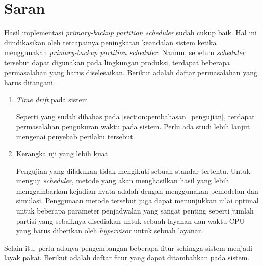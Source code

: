 \section{Saran}

Hasil implementasi \textit{primary-backup partition scheduler} sudah cukup baik. Hal ini
diindikasikan oleh tercapainya peningkatan keandalan sistem ketika menggunakan
\textit{primary-backup partition scheduler}. Namun, sebelum \textit{scheduler} tersebut dapat
digunakan pada lingkungan produksi, terdapat beberapa permasalahan yang harus diselesaikan.
Berikut adalah daftar permasalahan yang harus ditangani.

\begin{enumerate}

	\item \textit{Time drift} pada sistem

		Seperti yang sudah dibahas pada \autoref{section:pembahasan_pengujian}, terdapat
		permasalahan pengukuran waktu pada sistem. Perlu ada studi lebih lanjut mengenai
		penyebab perilaku tersebut.

	\item Kerangka uji yang lebih kuat

		Pengujian yang dilakukan tidak mengikuti sebuah standar tertentu. Untuk menguji
		\textit{scheduler}, metode yang akan menghasilkan hasil yang lebih menggambarkan
		kejadian nyata adalah dengan menggunakan pemodelan dan simulasi. Penggunaan
		metode tersebut juga dapat menunjukkan nilai optimal untuk beberapa parameter
		penjadwalan yang sangat penting seperti jumlah partisi yang sebaiknya disediakan
		untuk sebuah layanan dan waktu CPU yang harus diberikan oleh \textit{hypervisor}
		untuk sebuah layanan.

\end{enumerate}

Selain itu, perlu adanya pengembangan beberapa fitur sehingga sistem menjadi layak pakai.
Berikut adalah daftar fitur yang dapat ditambahkan pada sistem.

